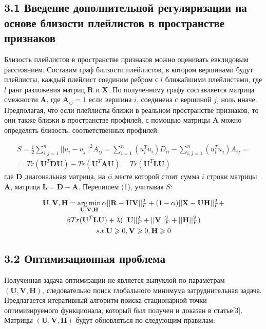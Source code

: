 \documentclass[12pt,twoside]{article}
\begin{document}
\subsection{3.1 Введение дополнительной регуляризации на основе близости плейлистов в пространстве признаков}

Близость плейлистов в пространстве признаков можно оценивать евклидовым расстоянием. Составим граф близости плейлистов, в котором вершинами будут плейлисты, каждый плейлист соединим ребром с $l$ ближайшими плейлистами, где $l$ ранг разложения матриц $\mathbf{R}$ и $\mathbf{X}$. По полученному графу составляется матрица смежности $\mathbf{A}$, где $\mathbf{A}_{ij} = 1$ если вершина $i$, соединена с вершиной $j$, ноль иначе. Предполагая, что если плейлисты близки в реальном пространстве признаков, то они также близки в пространстве профилей, с помощью матрицы $\mathbf{A}$ можно определять близость, соответственных профилей:

\begin{equation}
\begin{gathered}
S = \frac{1}{2}\sum_{i, j = 1}^n||u_i - u_j||^2A_{ij} = \sum_{i = 1}^n (u_i^Tu_i)D_{ii} - \sum_{i,j = 1}^n (u_i^Tu_j)A_{ij} =\\= {Tr}(\mathbf{U}^T\mathbf{DU}) -  {Tr}(\mathbf{U}^T\mathbf{AU}) = {Tr}(\mathbf{U}^T\mathbf{LU})
\end{gathered}
\end{equation}
где $\mathbf{D}$ диагональная матрица, на $ii$ месте которой стоит сумма $i$ строки матрицы $\mathbf{A}$, матрица $\mathbf{L} = \mathbf{D} - \mathbf{A}$. Перепишем (1), учитывая $S$:

\begin{equation}
\begin{gathered}
\mathbf{U, V, H} = \argmin_{\mathbf{U, V, H}}\alpha||\mathbf{R} - \mathbf{UV}||_F^2 +(1 - \alpha) ||\mathbf{X} - \mathbf{UH}||_F^2 + \\ \beta{Tr}(\mathbf{U}^T\mathbf{LU}) +  \lambda(||\mathbf{U}||_F^2 + ||\mathbf{V}||_F^2 + ||\mathbf{H}||_F^2)\\
 s.t. \mathbf{U} \geq 0,  \mathbf{V} \geq 0,  \mathbf{H} \geq 0
\end{gathered}
\end{equation}

\subsection{3.2 Оптимизационная проблема}

Полученная задача оптимизации не является выпуклой по параметрам $(\mathbf{U, V, H})$, следовательно поиск глобального минимума затруднительная задача. Предлагается итеративный алгоритм поиска стационарной точки оптимизируемого функционала, который был получен и доказан в статье[3]. Матрицы $(\mathbf{U, V, H})$ будут обновляться по следующим правилам:
\end{document}
